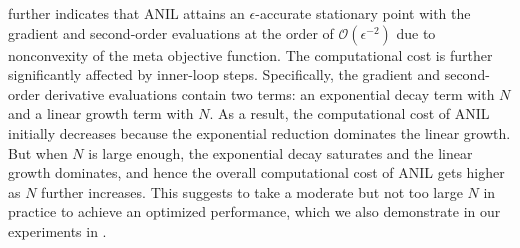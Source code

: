 \documentclass{osudissert96}
\begin{document}


 further indicates that ANIL attains an $\epsilon$-accurate stationary point with the gradient and second-order evaluations at the order of $\mathcal{O}(\epsilon^{-2})$ due to nonconvexity of the meta objective function. The computational cost is further significantly affected by inner-loop steps. Specifically, the gradient and second-order derivative evaluations contain two terms: an exponential decay term with $N$ and a linear growth term with $N$. As a result, the computational cost of ANIL initially decreases because the exponential reduction dominates the linear growth. But when $N$ is large enough, the exponential decay saturates and the linear growth dominates, and hence the overall computational cost of ANIL gets higher as $N$ further increases. 
 This suggests to take a moderate but not too large $N$ in practice to achieve an optimized performance, which we also demonstrate in our experiments in .
\end{document}
